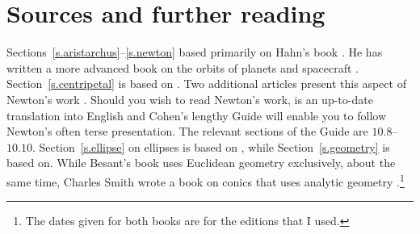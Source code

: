 
\section*{Sources and further reading}

Sections~\ref{s.aristarchus}--\ref{s.newton} based primarily on Hahn's book \cite{hahn-cic}. He has written a more advanced book on the orbits of planets and spacecraft \cite{hahn-orbits}. Section~\ref{s.centripetal} is based on \cite{griffiths}. Two additional articles present this aspect of Newton's work \cite{hauser-lang,stein}. Should you wish to read Newton's work, \cite{newton-cohen} is an up-to-date translation into English and Cohen's lengthy Guide will enable you to follow Newton's often terse presentation. The relevant sections of the Guide are $10.8$--$10.10$. Section~\ref{s.ellipse} on ellipses is based on \cite{wiki-ellipse}, while Section~\ref{s.geometry} is based on\cite{besant}. While Besant's book uses Euclidean geometry exclusively, about the same time, Charles Smith wrote a book on conics that uses analytic geometry \cite{smith}.\footnote{The dates given for both books are for the editions that I used.}



